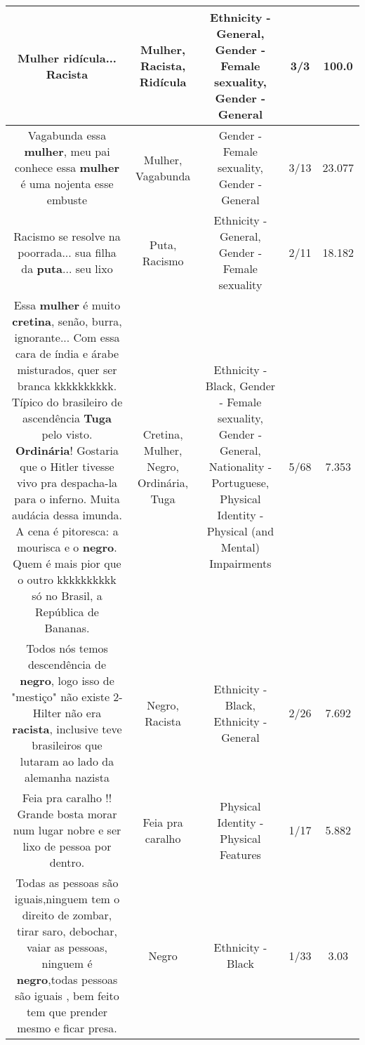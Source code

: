 \documentclass[11pt]{article}
\newlength\mylength
\begin{document}
\begin{center}
\begin{longtable}{|C{.65\mylength}|C{.30\mylength}|C{.12\mylength}|C{.12\mylength}|C{.12\mylength}|}
  \small Mulher \textbf{ridícula}... Racista\normalsize   & Mulher, Racista, Ridícula & Ethnicity - General, Gender - Female sexuality, Gender - General & 3/3 & 100.0 \\  \hline
  \small Vagabunda essa \textbf{mulher}, meu pai conhece essa \textbf{mulher} é uma nojenta esse embuste\normalsize   & Mulher, Vagabunda & Gender - Female sexuality, Gender - General & 3/13 & 23.077 \\  \hline
  \small Racismo se resolve na poorrada... sua filha da \textbf{puta}... seu lixo\normalsize   & Puta, Racismo & Ethnicity - General, Gender - Female sexuality & 2/11 & 18.182 \\  \hline
  \small Essa \textbf{mulher} é muito \textbf{cretina}, senão, burra, ignorante... Com essa cara de índia e árabe misturados, quer ser branca kkkkkkkkkk. Típico do brasileiro de ascendência \textbf{Tuga} pelo visto. \textbf{Ordinária}! Gostaria que o Hitler tivesse vivo pra despacha-la para o inferno. Muita audácia dessa imunda. A cena é pitoresca: a mourisca e o \textbf{negro}. Quem é mais pior que o outro kkkkkkkkkk só no Brasil, a República de Bananas.\normalsize   & Cretina, Mulher, Negro, Ordinária, Tuga & Ethnicity - Black, Gender - Female sexuality, Gender - General, Nationality - Portuguese, Physical Identity - Physical (and Mental) Impairments & 5/68 & 7.353 \\  \hline
  \small Todos nós temos descendência de \textbf{negro}, logo isso de "mestiço" não existe 2-Hilter não era \textbf{racista}, inclusive teve brasileiros que lutaram ao lado da alemanha nazista\normalsize   & Negro, Racista & Ethnicity - Black, Ethnicity - General & 2/26 & 7.692 \\  \hline
  \small Feia pra caralho !! Grande bosta morar num lugar nobre e ser lixo de pessoa por dentro.\normalsize   & Feia pra caralho & Physical Identity - Physical Features & 1/17 & 5.882 \\  \hline
  \small Todas as pessoas são iguais,ninguem tem o direito de zombar, tirar saro, debochar, vaiar as pessoas, ninguem é \textbf{negro},todas pessoas são iguais , bem feito tem que prender mesmo e ficar presa.\normalsize   & Negro & Ethnicity - Black & 1/33 & 3.03 \\  \hline

\end{longtable}
\end{center}
\end{document}
